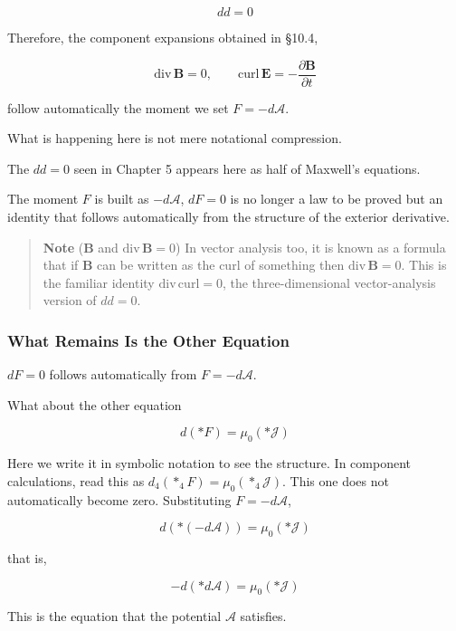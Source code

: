 \documentclass[a4paper,12pt,openany]{book}
\begin{document}
\[
dd=0
\]

Therefore, the component expansions obtained in §10.4,

\[
\mathrm{div}\,\mathbf{B}=0,
\qquad
\mathrm{curl}\,\mathbf{E}
=
-\frac{\partial\mathbf{B}}{\partial t}
\]

follow automatically the moment we set \(F=-d\mathcal{A}\).

What is happening here is not mere notational compression.

The \(dd=0\) seen in Chapter 5 appears here as half of Maxwell's
equations.

The moment \(F\) is built as \(-d\mathcal{A}\), \(dF=0\) is no longer a
law to be proved but an identity that follows automatically from the
structure of the exterior derivative.

\begin{quote}
\textbf{Note} (\(\mathbf{B}\) and \(\mathrm{div}\,\mathbf{B}=0\)) In
vector analysis too, it is known as a formula that if \(\mathbf{B}\) can
be written as the curl of something then \(\mathrm{div}\,\mathbf{B}=0\).
This is the familiar identity \(\mathrm{div}\,\mathrm{curl}=0\), the
three-dimensional vector-analysis version of \(dd=0\).
\end{quote}

\hypertarget{what-remains-is-the-other-equation}{%
\subsubsection{What Remains Is the Other
Equation}\label{what-remains-is-the-other-equation}}

\(dF=0\) follows automatically from \(F=-d\mathcal{A}\).

What about the other equation

\[
d(\ast F)
=
\mu_0(\ast\mathcal{J})
\]

Here we write it in symbolic notation to see the structure. In component
calculations, read this as \(d_4(\ast_4F)=\mu_0(\ast_4\mathcal{J})\).
This one does not automatically become zero. Substituting
\(F=-d\mathcal{A}\),

\[
d(\ast(-d\mathcal{A}))
=
\mu_0(\ast\mathcal{J})
\]

that is,

\[
-d(\ast d\mathcal{A})
=
\mu_0(\ast\mathcal{J})
\]

This is the equation that the potential \(\mathcal{A}\) satisfies.
\end{document}
